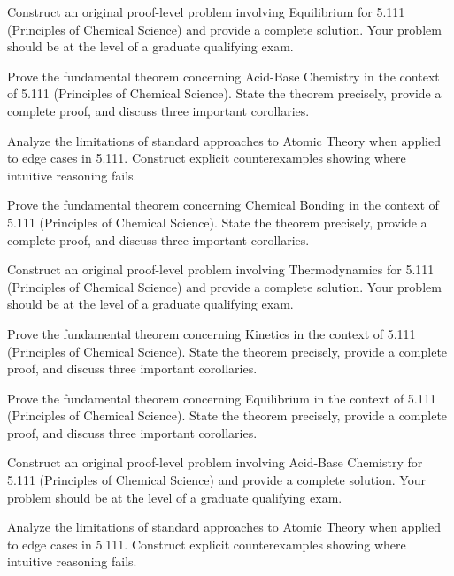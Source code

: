\documentclass[12pt,a4paper]{exam}
\begin{document}
\begin{questions}
\vspace{0.3cm}

\question[3]
Construct an original proof-level problem involving Equilibrium for 5.111 (Principles of Chemical Science) and provide a complete solution. Your problem should be at the level of a graduate qualifying exam.

\vspace{0.3cm}

\question[2]
Prove the fundamental theorem concerning Acid-Base Chemistry in the context of 5.111 (Principles of Chemical Science). State the theorem precisely, provide a complete proof, and discuss three important corollaries.

\vspace{0.3cm}

\question[3]
Analyze the limitations of standard approaches to Atomic Theory when applied to edge cases in 5.111. Construct explicit counterexamples showing where intuitive reasoning fails.

\vspace{0.3cm}

\question[6]
Prove the fundamental theorem concerning Chemical Bonding in the context of 5.111 (Principles of Chemical Science). State the theorem precisely, provide a complete proof, and discuss three important corollaries.

\vspace{0.3cm}

\question[5]
Construct an original proof-level problem involving Thermodynamics for 5.111 (Principles of Chemical Science) and provide a complete solution. Your problem should be at the level of a graduate qualifying exam.

\vspace{0.3cm}

\question[5]
Prove the fundamental theorem concerning Kinetics in the context of 5.111 (Principles of Chemical Science). State the theorem precisely, provide a complete proof, and discuss three important corollaries.

\vspace{0.3cm}

\question[2]
Prove the fundamental theorem concerning Equilibrium in the context of 5.111 (Principles of Chemical Science). State the theorem precisely, provide a complete proof, and discuss three important corollaries.

\vspace{0.3cm}

\question[5]
Construct an original proof-level problem involving Acid-Base Chemistry for 5.111 (Principles of Chemical Science) and provide a complete solution. Your problem should be at the level of a graduate qualifying exam.

\vspace{0.3cm}

\question[3]
Analyze the limitations of standard approaches to Atomic Theory when applied to edge cases in 5.111. Construct explicit counterexamples showing where intuitive reasoning fails.

\vspace{0.3cm}

\end{questions}
\end{document}
